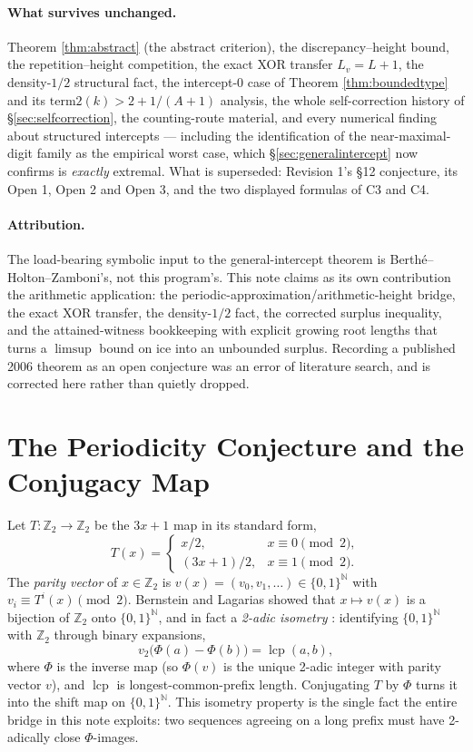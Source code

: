 \documentclass[11pt]{article}
\newcommand{\Z}{\mathbb{Z}}
\newcommand{\N}{\mathbb{N}}
\begin{document}
\paragraph{What survives unchanged.} Theorem \ref{thm:abstract} (the abstract criterion), the
discrepancy--height bound, the repetition--height competition, the exact XOR transfer
$L_v=L+1$, the density-$1/2$ structural fact, the intercept-$0$ case of
Theorem \ref{thm:boundedtype} and its $\text{term2}(k)>2+1/(A+1)$ analysis, the whole
self-correction history of \S\ref{sec:selfcorrection}, the counting-route material, and every
numerical finding about structured intercepts --- including the identification of the
near-maximal-digit family as the empirical worst case, which \S\ref{sec:generalintercept} now
confirms is \emph{exactly} extremal. What is superseded: Revision 1's \S12 conjecture, its Open 1,
Open 2 and Open 3, and the two displayed formulas of C3 and C4.

\paragraph{Attribution.} The load-bearing symbolic input to the general-intercept theorem is
Berth\'e--Holton--Zamboni's, not this program's. This note claims as its own contribution the
arithmetic application: the periodic-approximation/arithmetic-height bridge, the exact XOR
transfer, the density-$1/2$ fact, the corrected surplus inequality, and the attained-witness
bookkeeping with explicit growing root lengths that turns a $\limsup$ bound on $\text{ice}$ into an
unbounded surplus. Recording a published 2006 theorem as an open conjecture was an error of
literature search, and is corrected here rather than quietly dropped.

\section{The Periodicity Conjecture and the Conjugacy Map}
\label{sec:conjecture}

Let $T:\Z_2\to\Z_2$ be the $3x+1$ map in its standard form,
\[
T(x)=\begin{cases} x/2, & x\equiv 0 \pmod 2,\\ (3x+1)/2, & x\equiv 1\pmod 2.\end{cases}
\]
The \emph{parity vector} of $x\in\Z_2$ is $v(x)=(v_0,v_1,\dots)\in\{0,1\}^\N$ with $v_i\equiv T^i(x)\pmod 2$. Bernstein and Lagarias showed that $x\mapsto v(x)$ is a bijection of $\Z_2$ onto $\{0,1\}^\N$, and in fact a \emph{2-adic isometry} \cite{BernsteinLagarias1996,Bernstein1994}: identifying $\{0,1\}^\N$ with $\Z_2$ through binary expansions,
\[
v_2\bigl(\Phi(a)-\Phi(b)\bigr) = \operatorname{lcp}(a,b),
\]
where $\Phi$ is the inverse map (so $\Phi(v)$ is the unique 2-adic integer with parity vector $v$), and $\operatorname{lcp}$ is longest-common-prefix length. Conjugating $T$ by $\Phi$ turns it into the shift map on $\{0,1\}^\N$. This isometry property is the single fact the entire bridge in this note exploits: two sequences agreeing on a long prefix must have 2-adically close $\Phi$-images.
\end{document}
